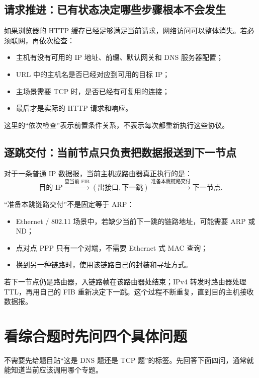 \documentclass[UTF8,fontset=none,11pt,a4paper]{ctexart}
\begin{document}
\subsection{请求推进：已有状态决定哪些步骤根本不会发生}

如果浏览器的 HTTP 缓存已经足够满足当前请求，网络访问可以整体消失。若必须联网，再依次检查：

\begin{itemize}
  \item 主机有没有可用的 IP 地址、前缀、默认网关和 DNS 服务器配置；
  \item URL 中的主机名是否已经对应到可用的目标 IP；
  \item 主场景需要 TCP 时，是否已经有可复用的连接；
  \item 最后才是实际的 HTTP 请求和响应。
\end{itemize}

这里的“依次检查”表示前置条件关系，不表示每次都重新执行这些协议。

\subsection{逐跳交付：当前节点只负责把数据报送到下一节点}

对于一条普通 IP 数据报，当前主机或路由器真正执行的是：
\[
\text{目的 IP}
\xrightarrow{\text{查当前 FIB}}
(\text{出接口},\text{下一跳})
\xrightarrow{\text{准备本跳链路交付}}
\text{下一节点}.
\]

“准备本跳链路交付”不是固定等于 ARP：
\begin{itemize}
  \item Ethernet / 802.11 场景中，若缺少当前下一跳的链路地址，可能需要 ARP 或 ND；
  \item 点对点 PPP 只有一个对端，不需要 Ethernet 式 MAC 查询；
  \item 换到另一种链路时，使用该链路自己的封装和寻址方式。
\end{itemize}

若下一节点仍是路由器，入链路帧在该路由器处结束；IPv4 转发时路由器处理 TTL，再用自己的 FIB 重新决定下一跳。这个过程不断重复，直到目的主机接收数据报。

\section{看综合题时先问四个具体问题}

不需要先给题目贴“这是 DNS 题还是 TCP 题”的标签。先回答下面四问，通常就能知道当前应该调用哪个专题。
\end{document}
